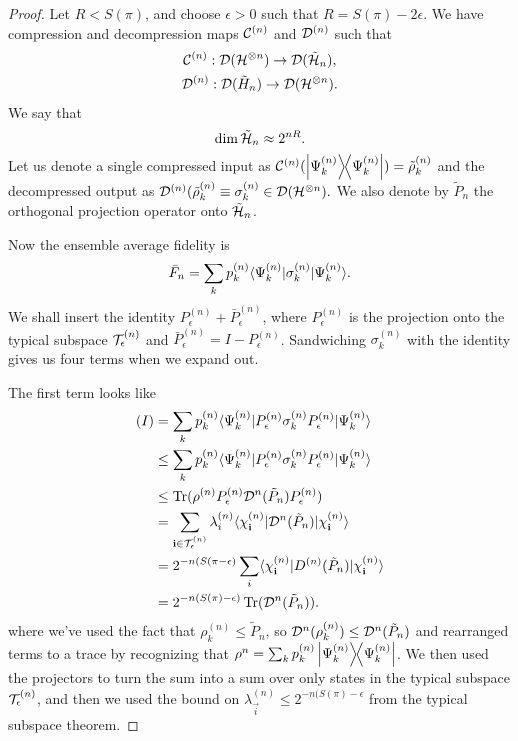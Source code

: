 \begin{proof}
    Let $R<S(\pi)$, and choose $\epsilon >0$ such that $R=S(\pi)-2\epsilon$. We have compression and decompression maps $\mathcal{C}^{(n)}$ and $\mathcal{D}^{(n)}$
    such that
    \begin{gather}
        \mathcal{C}^{(n)}: \mathcal{D}(\mathcal H^{\otimes n})\to \mathcal{D}(\tilde {\mathcal H}_n),\\
        \mathcal{D}^{(n)}: \mathcal{D}(\tilde H_n) \to \mathcal{D}(\mathcal H^{\otimes n}).
    \end{gather}
    We say that
    \begin{equation}
        \dim \tilde {\mathcal H}_n \approx 2^{nR}.
    \end{equation}
    Let us denote a single compressed input as $\mathcal{C}^{(n)}(\left\lvert{\Psi_k^{(n)}}\middle\rangle\!\middle\langle{\Psi_k^{(n)}}\right\rvert)=\tilde \rho_k^{(n)}$ and the decompressed output as $\mathcal{D}^{(n)}(\tilde \rho_k^{(n)} \equiv \sigma_k^{(n)} \in \mathcal{D}(\mathcal H^{\otimes n}).$
    We also denote by $\tilde P_n$ the orthogonal projection operator onto $\tilde {\mathcal H}_n$.
    
    Now the ensemble average fidelity is
    \begin{equation}
        \bar F_n =\sum_k p_k^{(n)} \langle\Psi_k^{(n)}\rvert\sigma_k^{(n)} \lvert\Psi_k^{(n)}\rangle.
    \end{equation}
    We shall insert the identity $P_\epsilon^{(n)}+\bar P_\epsilon^{(n)}$, where $P_\epsilon^{(n)}$ is the projection onto the typical subspace $\mathcal T_\epsilon^{(n)}$ and $\bar P_\epsilon^{(n)}=I-P_\epsilon^{(n)}$. Sandwiching $\sigma_k^{(n)}$ with the identity gives us four terms when we expand out.
    
    The first term looks like
    \begin{align*}
        (I) &= \sum_k p_k^{(n)} \langle\Psi_k^{(n)}\rvert P_\epsilon^{(n)} \sigma_k^{(n)} P_\epsilon^{(n)} \lvert\Psi_k^{(n)}\rangle\\
            &\leq \sum_k p_k^{(n)} \langle\Psi_k^{(n)}\rvert P_\epsilon^{(n)} \sigma_k^{(n)} P_\epsilon^{(n)} \lvert\Psi_k^{(n)}\rangle\\
            &\leq\operatorname{Tr}(\rho^{(n)} P_\epsilon^{(n)} \mathcal{D}^{n}(\tilde P_n) P_\epsilon^{(n)})\\
            &= \sum_{\boldsymbol{\mathbf{i}} \in \mathcal T_{\epsilon}^{(n)}} \lambda_i^{(n)} \langle\chi_{\boldsymbol{\mathbf{i}}}^{(n)}\rvert \mathcal{D}^{n}(\tilde P_n) \lvert\chi_{\boldsymbol{\mathbf{i}}}^{(n)}\rangle\\
            &= 2^{-n(S(\pi-\epsilon)} \sum_i \langle\chi_{\boldsymbol{\mathbf{i}}}^{(n)}\rvert D^{(n)}(\tilde P_n)\lvert\chi_{\boldsymbol{\mathbf{i}}}^{(n)}\rangle\\
            &= 2^{-n(S(\pi)-\epsilon)} \operatorname{Tr}(\mathcal{D}^n(\tilde P_n)).
    \end{align*}
    where we've used the fact that $\rho_k^{(n)} \leq \tilde P_n$, so $\mathcal{D}^n(\rho_k^{(n)})\leq \mathcal{D}^n(\tilde P_n)$ and rearranged terms to a trace by recognizing that $\rho^n=\sum_k p_k^{(n)} \left\lvert{\Psi_k^{(n)}}\middle\rangle\!\middle\langle{\Psi_k^{(n)}}\right\rvert$. We then used the projectors to turn the sum into a sum over only states in the typical subspace $\mathcal T_\epsilon^{(n)}$, and then we used the bound on $\lambda_{\vec i}^{(n)}\leq 2^{-n(S(\pi)-\epsilon}$ from the typical subspace theorem.
    

\end{proof}
